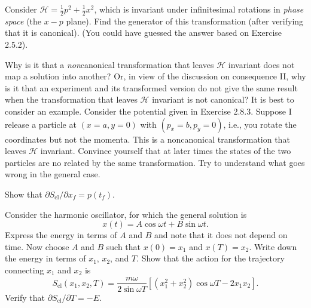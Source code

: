 \documentclass[../principles-of-quantum-mechanics.tex]{subfiles}
\begin{document}
\begin{questions}
		\question Consider $\mathcal{H} = \frac{1}{2}p^2 + \frac{1}{2}x^2$, which is invariant under infinitesimal rotations in \textit{phase space} (the $x-p$ plane). Find the generator of this transformation (after verifying that it is canonical). (You could have guessed the answer based on Exercise 2.5.2).
		
		\question Why is it that a \textit{non}canonical transformation that leaves $\mathcal{H}$ invariant does not map a solution into another? Or, in view of the discussion on consequence II, why is it that an experiment and its transformed version do not give the same result when the transformation that leaves $\mathcal{H}$ invariant is not canonical? It is best to consider an example. Consider the potential given in Exercise 2.8.3. Suppose I release a particle at $(x = a, y = 0)$ with $(p_x = b, p_y = 0)$, i.e., you rotate the coordinates but not the momenta. This is a noncanonical transformation that leaves $\mathcal{H}$ invariant. Convince yourself that at later times the states of the two particles are no related by the same transformation. Try to understand what goes wrong in the general case.
		
		\question Show that $\partial S_{\text{cl}}/\partial x_f = p(t_f)$.
		
		\question Consider the harmonic oscillator, for which the general solution is
		\[
			x(t) = A\cos\omega t + B\sin\omega t.
		\]
		Express the energy in terms of $A$ and $B$ and note that it does not depend on time. Now choose $A$ and $B$ such that $x(0) = x_1$ and $x(T) = x_2$. Write down the energy in terms of $x_1$, $x_2$, and $T$. Show that the action for the trajectory connecting $x_1$ and $x_2$ is
		\[
			S_{\text{cl}}(x_1, x_2, T) = \frac{m\omega}{2\sin\omega T}[(x_1^2+x_2^2)\cos\omega T - 2x_1x_2].
		\]
		Verify that $\partial S_{\text{cl}}/\partial T = -E$.
	\end{questions}
\end{document}
